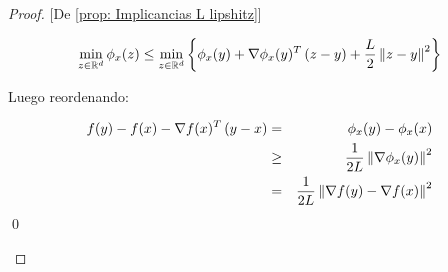 \begin{proof}{[De \ref{prop: Implicancias L lipshitz}]}
\begin{enumerate}
		\begin{equation*}
			\min\limits_{z \in {\mathbb{R}}^d} {\phi_x(z)} \leq \min\limits_{z \in {\mathbb{R}}^d} \left\lbrace\phi_x(y) + \nabla \phi_x(y)^T \left(z-y\right) + \dfrac{L}{2}\left\lVert z-y\right\rVert^2\right\rbrace
		\end{equation*}
		
		Luego reordenando:
		
		\begin{equation*}
		\begin{aligned}
			f(y) - f(x) - \nabla f(x)^T \left(y-x\right) & = & \phi_x(y) - \phi_x(x) \\
			& \geq & \frac{1}{2L} \left\lVert\nabla \phi_x(y)\right\rVert^2 \\
			& = & \frac{1}{2L} \left\lVert\nabla f(y) - \nabla f(x)\right\rVert^2
		\end{aligned}
		\end{equation*}
		\qed
	\end{enumerate}
\end{proof}

